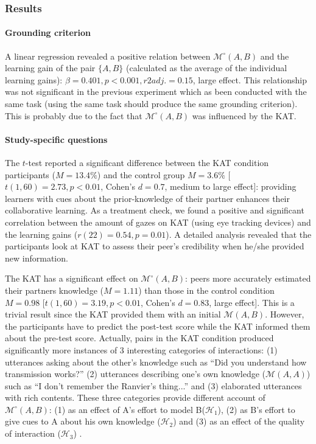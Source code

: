 \documentclass[natbib]{svjour3}
\newcommand{\A}{A\xspace}
\newcommand{\B}{B\xspace}
\newcommand{\gmodel}[2]{{$\mathcal{M}(#1, #2)$}}
\newcommand{\gModel}[2]{{$\mathcal{M}^{\circ}(#1, #2)$}}
\begin{document}
\subsubsection*{Results}

\paragraph{Grounding criterion} A linear regression revealed a positive relation
between \gModel{A}{B} and the learning gain of the pair $\{A, B\}$ (calculated
as the average of the individual learning gains): $\beta= 0.401, p < 0.001, r2adj.
= 0.15$, large effect. This relationship was not significant in the previous
experiment which as been conducted with the same task (using the same task
should produce the same grounding criterion). This is probably due to the fact that
\gModel{A}{B} was influenced by the KAT.

\paragraph{Study-specific questions} The $t$-test reported a significant
difference between the KAT condition participants ($M = 13.4\%$) and the control
group $M = 3.6\%$ [$t(1, 60) = 2.73, p < 0.01$, Cohen's $d = 0.7$, medium to large
effect]: providing learners with cues about the prior-knowledge of their partner
enhances their collaborative learning. As a treatment check, we found a positive
and significant correlation between the amount of gazes on KAT (using eye
tracking devices) and the learning gains ($r(22) = 0.54, p = 0.01$). A detailed
analysis revealed that the participants look at KAT to assess their peer's credibility
when he/she provided new information. 

The KAT has a significant effect on \gModel{A}{B}: peers more accurately
estimated their partners knowledge ($M = 1.11$) than those in the control
condition $M = 0.98$ [$t(1, 60) = 3.19, p < 0.01$, Cohen's $d = 0.83$, large
effect]. This is a trivial result since the KAT provided them with an initial
\gmodel{A}{B}. However, the participants have to predict the post-test score while the
KAT informed them about the pre-test score. Actually, pairs in the KAT condition
produced significantly more instances of 3 interesting categories of
interactions: (1) utterances asking about the other's knowledge such as ``Did
you understand how transmission works?'' (2) utterances describing one's own
knowledge (\gmodel{A}{A}) such as ``I don't remember the Ranvier's thing...''
and (3) elaborated utterances with rich contents. These three categories provide
different account of \gModel{A}{B}: (1) as an effect of \A's effort to model
\B  ($\mathcal{H}_{1}$), (2) as \B's effort to give cues to \A about his own
knowledge ($\mathcal{H}_{2}$) and (3) as an effect of the quality of
interaction ($\mathcal{H}_{3}$) .
\end{document}
